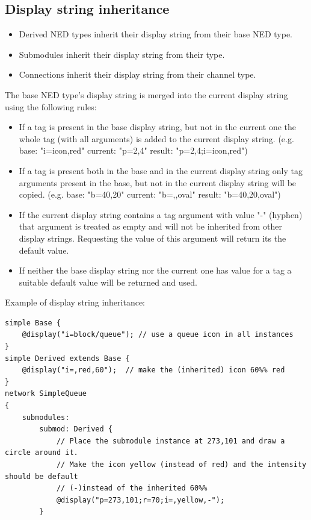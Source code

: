 \subsection{Display string inheritance}

\begin{itemize}
  \item Derived NED types inherit their display string from their base NED type. 
  \item Submodules inherit their display string from their type. 
  \item Connections inherit their display string from their channel type.
\end{itemize}

The base NED type's display string is merged into the current display string
using the following rules:

\begin{itemize}
  \item If a tag is present in the base display string, but not in the current one
        the whole tag (with all arguments) is added to the current display string.
        (e.g. base: "i=icon,red" current: "p=2,4" result: "p=2,4;i=icon,red")
  \item If a tag is present both in the base and in the current display string
        only tag arguments present in the base, but not in the current display string
        will be copied.
        (e.g. base: "b=40,20" current: "b=,,oval" result: "b=40,20,oval")
  \item If the current display string contains a tag argument with value "-" (hyphen)
        that argument is treated as empty and will not be inherited from other
        display strings. Requesting the value of this argument will return its the 
        default value.
  \item If neither the base display string nor the current one has value for a tag
        a suitable default value will be returned and used.
\end{itemize}

Example of display string inheritance:
\begin{verbatim}
simple Base {
    @display("i=block/queue"); // use a queue icon in all instances
}
simple Derived extends Base {
    @display("i=,red,60");  // make the (inherited) icon 60%% red
}
network SimpleQueue
{
    submodules:
        submod: Derived {
            // Place the submodule instance at 273,101 and draw a circle around it.
            // Make the icon yellow (instead of red) and the intensity should be default 
            // (-)instead of the inherited 60%%
            @display("p=273,101;r=70;i=,yellow,-");
        }
\end{verbatim}

